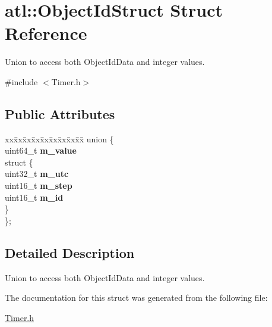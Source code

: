 \hypertarget{structatl_1_1ObjectIdStruct}{}\section{atl\+:\+:Object\+Id\+Struct Struct Reference}
\label{structatl_1_1ObjectIdStruct}


Union to access both Object\+Id\+Data and integer values.  




{\ttfamily \#include $<$Timer.\+h$>$}

\subsection*{Public Attributes}
\begin{DoxyCompactItemize}
\item 
\begin{tabbing}
xx\=xx\=xx\=xx\=xx\=xx\=xx\=xx\=xx\=\kill
union \{\\
\>uint64\_t {\bfseries m\_value}\\
\>struct \{\\
\>\>uint32\_t {\bfseries m\_utc}\\
\>\>uint16\_t {\bfseries m\_step}\\
\>\>uint16\_t {\bfseries m\_id}\\
\>\} \hypertarget{unionatl_1_1ObjectIdStruct_1_1_0D0_a15c8cb63193f2171ba8a41c6090b1bb4}{}\label{unionatl_1_1ObjectIdStruct_1_1_0D0_a15c8cb63193f2171ba8a41c6090b1bb4}
\\
\}; \hypertarget{structatl_1_1ObjectIdStruct_a08623b23ff9cd7ede22b70deda9ff49b}{}\label{structatl_1_1ObjectIdStruct_a08623b23ff9cd7ede22b70deda9ff49b}
\\

\end{tabbing}\end{DoxyCompactItemize}


\subsection{Detailed Description}
Union to access both Object\+Id\+Data and integer values. 

The documentation for this struct was generated from the following file\+:\begin{DoxyCompactItemize}
\item 
\hyperlink{Timer_8h}{Timer.\+h}\end{DoxyCompactItemize}
